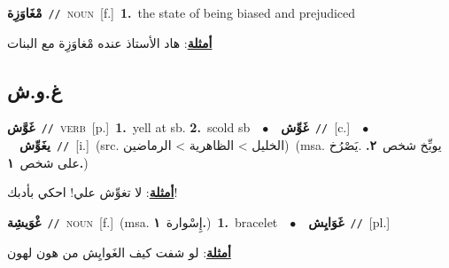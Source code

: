 \documentclass[10pt,a4paper,twoside]{article} %
\begin{document}
\begin{multicols}{2}
{\setlength\topsep{0pt}\textbf{\foreignlanguage{arabic}{مْغَاوَزِة}}\ {\color{gray}\texttt{//}\color{black}}\ \textsc{noun}\ [f.]\ \textbf{1.}~the state of being biased and prejudiced\  \begin{flushright}\color{gray}\foreignlanguage{arabic}{\textbf{\underline{\foreignlanguage{arabic}{أمثلة}}}: هاد الأستاذ عنده مْغاوَزِة مع البنات}\end{flushright}\color{black}} \vspace{2mm}

\vspace{-3mm}
\subsection*{\color{blue}\foreignlanguage{arabic}{غ.و.ش}\color{blue}{}} 

{\setlength\topsep{0pt}\textbf{\foreignlanguage{arabic}{غَوَّش}}\ {\color{gray}\texttt{//}\color{black}}\ \textsc{verb}\ [p.]\ \textbf{1.}~yell at sb.  \textbf{2.}~scold sb\ \ $\bullet$\ \ \setlength\topsep{0pt}\textbf{\foreignlanguage{arabic}{غَوِّش}}\ {\color{gray}\texttt{//}\color{black}}\ [c.]\ \ $\bullet$\ \ \setlength\topsep{0pt}\textbf{\foreignlanguage{arabic}{يغَوِّش}}\ {\color{gray}\texttt{//}\color{black}}\ [i.]\ (src. \color{gray}\foreignlanguage{arabic}{الخليل > الظاهرية > الرماضين}\color{black})\ \color{gray}(msa. \foreignlanguage{arabic}{يوبِّخ شخص}~\foreignlanguage{arabic}{\textbf{٢.}}  .\foreignlanguage{arabic}{يَصْرُخ على شخص}~\foreignlanguage{arabic}{\textbf{١.}})\color{black}\  \begin{flushright}\color{gray}\foreignlanguage{arabic}{\textbf{\underline{\foreignlanguage{arabic}{أمثلة}}}: لا تغوِّش علي! احكي بأدبك!}\end{flushright}\color{black}} \vspace{2mm}

{\setlength\topsep{0pt}\textbf{\foreignlanguage{arabic}{غْوَيشِة}}\ {\color{gray}\texttt{//}\color{black}}\ \textsc{noun}\ [f.]\ \color{gray}(msa. \foreignlanguage{arabic}{إِسْوارة}~\foreignlanguage{arabic}{\textbf{١.}})\color{black}\ \textbf{1.}~bracelet\ \ $\bullet$\ \ \setlength\topsep{0pt}\textbf{\foreignlanguage{arabic}{غَوَايِش}}\ {\color{gray}\texttt{//}\color{black}}\ [pl.]\  \begin{flushright}\color{gray}\foreignlanguage{arabic}{\textbf{\underline{\foreignlanguage{arabic}{أمثلة}}}: لو شفت كيف الغَوايِش من هون لهون}\end{flushright}\color{black}} \vspace{2mm}


\end{multicols}
\end{document}
